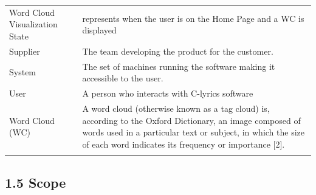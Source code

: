 \documentclass[]{article}
\begin{document}
\begin{longtable}[c]{@{}ll@{}}
\\\addlinespace
\begin{minipage}[t]{0.47\columnwidth}\raggedright
Word Cloud Visualization State
\end{minipage} & \begin{minipage}[t]{0.47\columnwidth}\raggedright
represents when the user is on the Home Page and a WC is displayed
\end{minipage}
\\\addlinespace
\begin{minipage}[t]{0.47\columnwidth}\raggedright
Supplier
\end{minipage} & \begin{minipage}[t]{0.47\columnwidth}\raggedright
The team developing the product for the customer.
\end{minipage}
\\\addlinespace
\begin{minipage}[t]{0.47\columnwidth}\raggedright
System
\end{minipage} & \begin{minipage}[t]{0.47\columnwidth}\raggedright
The set of machines running the software making it accessible to the
user.
\end{minipage}
\\\addlinespace
\begin{minipage}[t]{0.47\columnwidth}\raggedright
User
\end{minipage} & \begin{minipage}[t]{0.47\columnwidth}\raggedright
A person who interacts with C-lyrics software
\end{minipage}
\\\addlinespace
\begin{minipage}[t]{0.47\columnwidth}\raggedright
Word Cloud (WC)
\end{minipage} & \begin{minipage}[t]{0.47\columnwidth}\raggedright
A word cloud (otherwise known as a tag cloud) is, according to the
Oxford Dictionary, an image composed of words used in a particular text
or subject, in which the size of each word indicates its frequency or
importance {[}2{]}.
\end{minipage}
\\\addlinespace
\bottomrule
\end{longtable}

\subsection{\textbf{1.5 Scope}}\label{scope}
\end{document}
